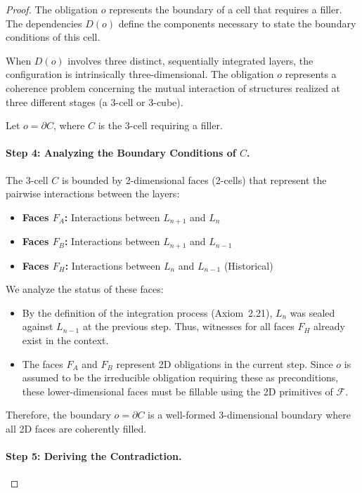 \documentclass[11pt]{article}
\theoremstyle{definition}
\theoremstyle{remark}
\begin{document}
\begin{proof}
The obligation $o$ represents the boundary of a cell that requires a filler. The dependencies $D(o)$
define the components necessary to state the boundary conditions of this cell.

When $D(o)$ involves three distinct, sequentially integrated layers, the configuration is intrinsically
three-dimensional. The obligation $o$ represents a coherence problem concerning the mutual interaction
of structures realized at three different stages (a 3-cell or 3-cube).

Let $o = \partial C$, where $C$ is the 3-cell requiring a filler.

\paragraph{Step 4: Analyzing the Boundary Conditions of $C$.}

The 3-cell $C$ is bounded by 2-dimensional faces (2-cells) that represent the pairwise interactions
between the layers:

\begin{itemize}
\item \textbf{Faces $F_A$:} Interactions between $L_{n+1}$ and $L_n$
\item \textbf{Faces $F_B$:} Interactions between $L_{n+1}$ and $L_{n-1}$
\item \textbf{Faces $F_H$:} Interactions between $L_n$ and $L_{n-1}$ (Historical)
\end{itemize}

We analyze the status of these faces:

\begin{itemize}
\item By the definition of the integration process (Axiom~2.21), $L_n$ was sealed against $L_{n-1}$
at the previous step. Thus, witnesses for all faces $F_H$ already exist in the context.

\item The faces $F_A$ and $F_B$ represent 2D obligations in the current step. Since $o$ is assumed to
be the irreducible obligation requiring these as preconditions, these lower-dimensional faces must
be fillable using the 2D primitives of $\mathcal{F}$.
\end{itemize}

Therefore, the boundary $o = \partial C$ is a well-formed 3-dimensional boundary where all 2D faces
are coherently filled.

\paragraph{Step 5: Deriving the Contradiction.}


\end{proof}
\end{document}
